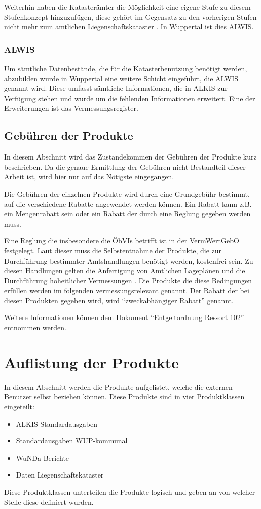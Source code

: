 Weiterhin haben die Katasterämter die Möglichkeit eine eigene Stufe zu diesem Stufenkonzept hinzuzufügen, diese gehört im Gegensatz zu den vorherigen Stufen nicht mehr zum amtlichen Liegenschaftskataster \autocite[vgl.][1-4]{bezk-grunddaten}. In Wuppertal ist dies \acs{ALWIS}.

\subsubsection{ALWIS}
Um sämtliche Datenbestände, die für die Katasterbenutzung benötigt werden, abzubilden wurde in Wuppertal eine weitere Schicht eingeführt, die \acf{ALWIS} genannt wird.
Diese umfasst sämtliche Informationen, die in ALKIS zur Verfügung stehen und wurde um die fehlenden Informationen erweitert.
Eine der Erweiterungen ist das Vermessungsregister.

\subsection{Gebühren der Produkte} \label{subsec:gebuehren}
In diesem Abschnitt wird das Zustandekommen der Gebühren der Produkte kurz beschrieben.
Da die genaue Ermittlung der Gebühren nicht Bestandteil dieser Arbeit ist, wird hier nur auf das Nötigste eingegangen. 

Die Gebühren der einzelnen Produkte wird durch eine Grundgebühr bestimmt, auf die verschiedene Rabatte angewendet werden können.
Ein Rabatt kann z.B. ein Mengenrabatt sein oder ein Rabatt der durch eine Reglung gegeben werden muss. 

Eine Reglung die insbesondere die \acp{ÖbVI} betrifft ist in der \ac{VermWertGebO} festgelegt.
Laut dieser muss die Selbstentnahme der Produkte, die zur Durchführung bestimmter Amtshandlungen benötigt werden, kostenfrei sein.
Zu diesen Handlungen gelten die Anfertigung von Amtlichen Lageplänen und die Durchführung hoheitlicher Vermessungen \autocite[vgl.][]{wupp-wunda-oebvi}.
Die Produkte die diese Bedingungen erfüllen werden im folgenden vermessungsrelevant genannt. Der Rabatt der bei diesen Produkten gegeben wird, wird "`zweckabhängiger Rabatt"' genannt.

Weitere Informationen können dem Dokument "`Entgeltordnung Ressort 102"' \autocite{wupp-entgelt} entnommen werden.

\section{Auflistung der Produkte} \label{sec:produktliste}
In diesem Abschnitt werden die Produkte aufgelistet, welche die externen Benutzer selbst beziehen können. Diese Produkte sind in vier Produktklassen eingeteilt:
\begin{itemize}
	\item ALKIS-Standardausgaben
	\item Standardausgaben WUP-kommunal
	\item WuNDa-Berichte
	\item Daten Liegenschaftskataster
\end{itemize}
Diese Produktklassen unterteilen die Produkte logisch und geben an von welcher Stelle diese definiert wurden.

